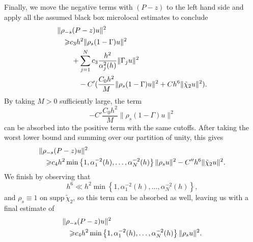 \documentclass[twoside, final]{amsart}
\theoremstyle{definition}
\numberwithin{equation}{section}
\begin{document}
Finally, we move the negative terms with $(P-z)$ to the left hand side and
apply all the assumed black box microlocal estimates to conclude
\begin{align*}
& \| \rho_{-s} (P-z) u \|^2 \notag \\
& \quad {\geqslant} c_3h^2\| \rho_{s} (1 -
\Gamma)  u \|^2 \notag \\
& \quad \quad + \sum_{j = 1}^N  c_3\frac{h^2}{\alpha_j^2(h)} \|  
\Gamma_j  u \|^2 \notag \\
& \quad \quad \quad -C'  ( 
\frac{C_0 h^2}{{M}} \| \rho_{s}(1 - \Gamma) u \|^2 + C h^6  \| {\tilde{\chi}}_2
u \|^2) .
\end{align*}
By taking $M>0$ sufficiently large, the term 
\[
-C' \frac{C_0 h^2}{{M}} \| \rho_{s}(1 - \Gamma) u \|^2
\]
can be absorbed into the positive term with the same cutoffs.  After
taking the worst lower bound and summing over our partition of unity, this
gives
\begin{align*}
& \| \rho_{-s} (P-z) u \|^2 \notag \\
& \quad {\geqslant} c_4 h^2 \min \left\{ 1, \alpha_1^{-2}(h), \ldots,
  \alpha_N^{-2} (h) \right\} \| \rho_s u \|^2 - C'' h^6  \| {\tilde{\chi}}_2
u \|^2.
\end{align*}
We finish by observing that 
\[
h^6 \ll h^2 \min \left\{ 1, \alpha_1^{-2}(h), \ldots,
  \alpha_N^{-2} (h) \right\},
\]
and $\rho_s \equiv 1$ on ${\mathrm{supp}\,} {\tilde{\chi}}_2$, so this term can be absorbed
as well, leaving us with a final estimate of
\begin{align*}
& \| \rho_{-s} (P-z) u \|^2 \notag \\
& \quad {\geqslant} c_4 h^2 \min \left\{ 1, \alpha_1^{-2}(h), \ldots,
  \alpha_N^{-2} (h) \right\} \| \rho_s u \|^2.
\end{align*}



\end{document}
